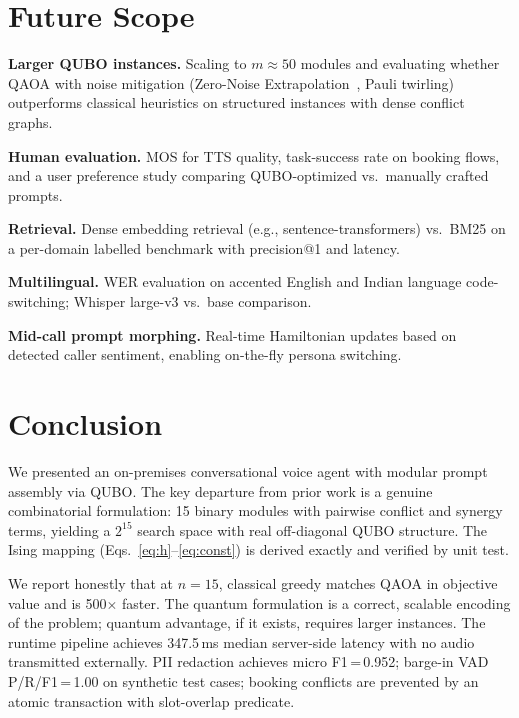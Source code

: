 \documentclass[journal]{IEEEtran}
\begin{document}
\section{Future Scope}

\textbf{Larger QUBO instances.} Scaling to $m \approx 50$ modules and
evaluating whether QAOA with noise mitigation (Zero-Noise
Extrapolation~\cite{temme2017}, Pauli twirling) outperforms classical
heuristics on structured instances with dense conflict graphs.

\textbf{Human evaluation.} MOS for TTS quality, task-success rate on
booking flows, and a user preference study comparing QUBO-optimized vs.\
manually crafted prompts.

\textbf{Retrieval.} Dense embedding retrieval (e.g., sentence-transformers)
vs.\ BM25 on a per-domain labelled benchmark with precision@1 and latency.

\textbf{Multilingual.} WER evaluation on accented English and Indian
language code-switching; Whisper large-v3 vs.\ base comparison.

\textbf{Mid-call prompt morphing.} Real-time Hamiltonian updates based on
detected caller sentiment, enabling on-the-fly persona switching.

\section{Conclusion}

We presented an on-premises conversational voice agent with modular
prompt assembly via QUBO. The key departure from prior work is a genuine
combinatorial formulation: 15 binary modules with pairwise conflict and
synergy terms, yielding a $2^{15}$ search space with real off-diagonal
QUBO structure. The Ising mapping (Eqs.~\eqref{eq:h}--\eqref{eq:const})
is derived exactly and verified by unit test.

We report honestly that at $n{=}15$, classical greedy matches QAOA
in objective value and is 500$\times$ faster. The quantum formulation
is a correct, scalable encoding of the problem; quantum advantage, if
it exists, requires larger instances. The runtime pipeline achieves
347.5\,ms median server-side latency with no audio transmitted externally.
PII redaction achieves micro F1\,=\,0.952; barge-in VAD P/R/F1\,=\,1.00
on synthetic test cases; booking conflicts are prevented by an atomic
transaction with slot-overlap predicate.
\end{document}
